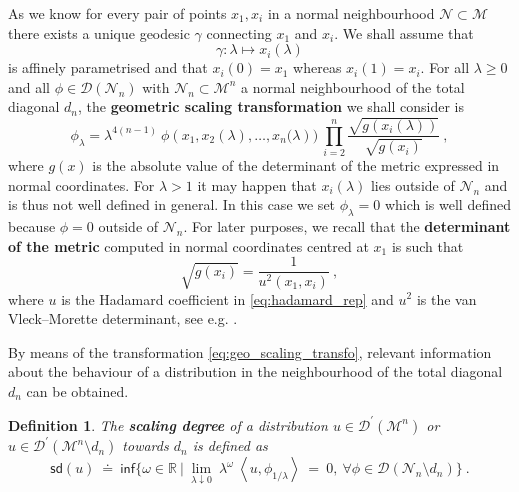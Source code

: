 \documentclass[12pt]{book}
\newcommand{\sd}{\mathsf{sd}}
\renewcommand{\inf}{\mathsf{inf}}
\newcommand{\sm}[1]{\left\langle#1\right\rangle}
\newcommand{\Dcal}{\mathcal{D}}
\newcommand{\Mcal}{\mathcal{M}}
\newcommand{\Ncal}{\mathcal{N}}
\newcommand{\Rbb}{\mathbb{R}}
\theoremstyle{break}
\newtheorem{definition}{Definition}
\begin{document}
As we know for every pair of points $x_1,x_i$ in a normal neighbourhood $\Ncal \subset \Mcal$ there exists a unique geodesic $\gamma$ connecting $x_1$ and $x_i$. We shall assume that
%
\begin{equation*}
\gamma : \lambda \mapsto x_i(\lambda) 
\end{equation*}
%
is affinely parametrised and that $x_i(0) =x_1$ whereas $x_i(1) = x_i$. For all $\lambda \geq 0$ and all $\phi \in \Dcal(\Ncal_n)$ with $\Ncal_n \subset \Mcal^n$ a normal neighbourhood of the total diagonal $d_n$, the \textbf{geometric scaling transformation} we shall consider is
%
\begin{equation}
\phi_\lambda = \lambda^{4(n-1)} \ \phi\left(x_1,x_2(\lambda ),\dots,x_n(\lambda\right)) \ \prod_{i=2}^n \frac{\sqrt{g(x_i(\lambda ))}}{\sqrt{g(x_i)}} \ ,
\label{eq:geo_scaling_transfo}
\end{equation}
%
where $g(x)$ is the absolute value of the determinant of the metric expressed in normal coordinates. For $\lambda > 1$ it may happen that $x_i(\lambda)$ lies outside of $\Ncal_n$ and is thus not well defined in general. In this case we set $\phi_\lambda = 0$ which is well defined because $\phi = 0$ outside of $\Ncal_n$. For later purposes, we recall that the \textbf{determinant of the metric} computed in normal coordinates centred at $x_1$ is such that
%
\begin{equation*}
\sqrt{g(x_i)} = \frac{1}{u^2(x_1,x_i)} \ , 
\end{equation*}
%
where $u$ is the Hadamard coefficient in \eqref{eq:hadamard_rep} and $u^2$ is the van Vleck--Morette determinant, see e.g. \cite{poisson_motion_2011}.

By means of the transformation \eqref{eq:geo_scaling_transfo}, relevant information about the behaviour of a distribution in the neighbourhood of the total diagonal $d_n$ can be obtained. 


\begin{definition}\label{def:scaling_degree}
The \textbf{scaling degree} of a distribution $u \in \Dcal^\prime(\Mcal^n)$ or $u \in \Dcal^\prime(\Mcal^n \setminus d_n)$ towards $d_n$ is defined as 
%
\begin{equation*}
\sd(u) \ \doteq \ \inf\bigg\{ \omega \in \Rbb \ \bigg| \ \lim_{\lambda \downarrow 0} \ \lambda^\omega \ \sm{u,\phi_{1/\lambda}} \ = \ 0, \ \forall \phi\in\Dcal(\Ncal_n\setminus d_n) \bigg\} \ .
\end{equation*}
%
\end{definition}
\end{document}
